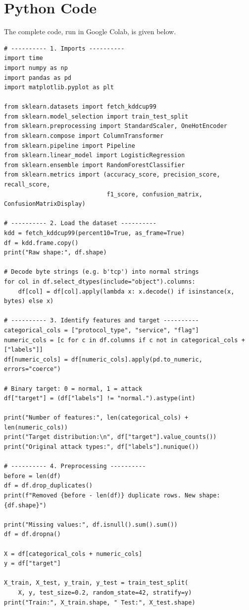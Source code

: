 \documentclass[12pt,a4paper]{article}
\begin{document}
\section{Python Code}
The complete code, run in Google Colab, is given below.

\begin{lstlisting}
# ---------- 1. Imports ----------
import time
import numpy as np
import pandas as pd
import matplotlib.pyplot as plt

from sklearn.datasets import fetch_kddcup99
from sklearn.model_selection import train_test_split
from sklearn.preprocessing import StandardScaler, OneHotEncoder
from sklearn.compose import ColumnTransformer
from sklearn.pipeline import Pipeline
from sklearn.linear_model import LogisticRegression
from sklearn.ensemble import RandomForestClassifier
from sklearn.metrics import (accuracy_score, precision_score, recall_score,
                             f1_score, confusion_matrix, ConfusionMatrixDisplay)

# ---------- 2. Load the dataset ----------
kdd = fetch_kddcup99(percent10=True, as_frame=True)
df = kdd.frame.copy()
print("Raw shape:", df.shape)

# Decode byte strings (e.g. b'tcp') into normal strings
for col in df.select_dtypes(include="object").columns:
    df[col] = df[col].apply(lambda x: x.decode() if isinstance(x, bytes) else x)

# ---------- 3. Identify features and target ----------
categorical_cols = ["protocol_type", "service", "flag"]
numeric_cols = [c for c in df.columns if c not in categorical_cols + ["labels"]]
df[numeric_cols] = df[numeric_cols].apply(pd.to_numeric, errors="coerce")

# Binary target: 0 = normal, 1 = attack
df["target"] = (df["labels"] != "normal.").astype(int)

print("Number of features:", len(categorical_cols) + len(numeric_cols))
print("Target distribution:\n", df["target"].value_counts())
print("Original attack types:", df["labels"].nunique())

# ---------- 4. Preprocessing ----------
before = len(df)
df = df.drop_duplicates()
print(f"Removed {before - len(df)} duplicate rows. New shape: {df.shape}")

print("Missing values:", df.isnull().sum().sum())
df = df.dropna()

X = df[categorical_cols + numeric_cols]
y = df["target"]

X_train, X_test, y_train, y_test = train_test_split(
    X, y, test_size=0.2, random_state=42, stratify=y)
print("Train:", X_train.shape, " Test:", X_test.shape)


\end{lstlisting}
\end{document}
